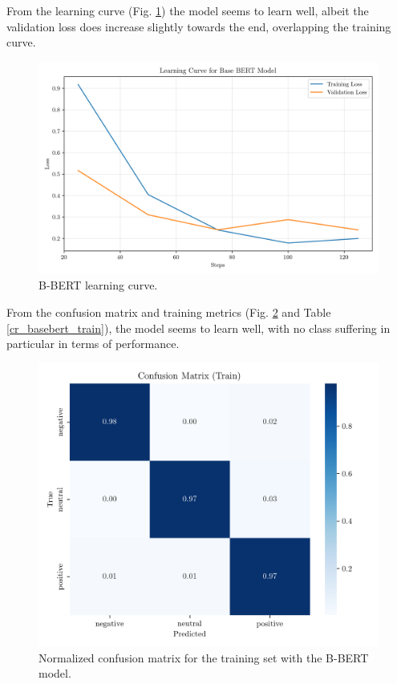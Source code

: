 \documentclass[conference]{IEEEtran}
\begin{document}
From the learning curve (Fig. \ref{fig:base_bert_learning_curve}) the model seems to learn well, albeit the validation loss does increase slightly towards the end, overlapping the training curve.

\begin{figure}[H]
    \centering
    \includegraphics[width=1\linewidth]{assets/base_bert_learning_curve.png}
    \caption{B-BERT learning curve.}
    \label{fig:base_bert_learning_curve}
\end{figure}

From the confusion matrix and training metrics (Fig. \ref{fig:base_bert_confusion_matrix_Train} and Table \ref{cr_basebert_train}), the model seems to learn well, with no class suffering in particular in terms of performance. 

\begin{figure}[H]
    \centering
    \includegraphics[width=1\linewidth]{assets/base_bert_confusion_matrix_Train.png}
    \caption{Normalized confusion matrix for the training set with the B-BERT model.}
    \label{fig:base_bert_confusion_matrix_Train}
\end{figure}
\end{document}
